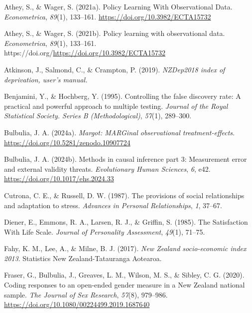 \documentclass[
  single column]{article}
\newlength{\cslhangindent}
\newenvironment{CSLReferences}[2] %
 {\begin{list}{}{%
  \setlength{\itemindent}{0pt}
  \setlength{\leftmargin}{0pt}
  \setlength{\parsep}{0pt}
  \ifodd #1
   \setlength{\leftmargin}{\cslhangindent}
   \setlength{\itemindent}{-1\cslhangindent}
  \fi
  \setlength{\itemsep}{#2\baselineskip}}}
 {\end{list}}
\begin{document}
\label{refs}
\begin{CSLReferences}{1}{0}
Athey, S., \& Wager, S. (2021a). Policy Learning With Observational
Data. \emph{Econometrica}, \emph{89}(1), 133--161.
\url{https://doi.org/10.3982/ECTA15732}

Athey, S., \& Wager, S. (2021b). Policy learning with observational
data. \emph{Econometrica}, \emph{89}(1), 133--161.
https://doi.org/\url{https://doi.org/10.3982/ECTA15732}

Atkinson, J., Salmond, C., \& Crampton, P. (2019). \emph{NZDep2018 index
of deprivation, user{'}s manual.}

Benjamini, Y., \& Hochberg, Y. (1995). Controlling the false discovery
rate: A practical and powerful approach to multiple testing.
\emph{Journal of the Royal Statistical Society. Series B
(Methodological)}, \emph{57}(1), 289--300.

Bulbulia, J. A. (2024a). \emph{Margot: MARGinal observational
treatment-effects}. \url{https://doi.org/10.5281/zenodo.10907724}

Bulbulia, J. A. (2024b). Methods in causal inference part 3: Measurement
error and external validity threats. \emph{Evolutionary Human Sciences},
\emph{6}, e42. \url{https://doi.org/10.1017/ehs.2024.33}

Cutrona, C. E., \& Russell, D. W. (1987). The provisions of social
relationships and adaptation to stress. \emph{Advances in Personal
Relationships}, \emph{1}, 37--67.

Diener, E., Emmons, R. A., Larsen, R. J., \& Griffin, S. (1985). The
Satisfaction With Life Scale. \emph{Journal of Personality Assessment},
\emph{49}(1), 71--75.

Fahy, K. M., Lee, A., \& Milne, B. J. (2017). \emph{{N}ew {Z}ealand
socio-economic index 2013}. Statistics New Zealand-Tatauranga Aotearoa.

Fraser, G., Bulbulia, J., Greaves, L. M., Wilson, M. S., \& Sibley, C.
G. (2020). Coding responses to an open-ended gender measure in a {N}ew
{Z}ealand national sample. \emph{The Journal of Sex Research},
\emph{57}(8), 979--986.
\url{https://doi.org/10.1080/00224499.2019.1687640}


\end{CSLReferences}
\end{document}
